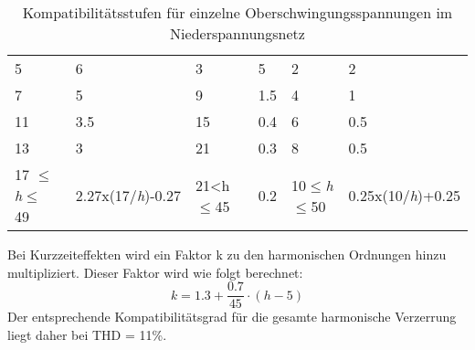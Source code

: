 \begin{table}[ht!]
{\begin{tabular}{|l|l|l|l|l|l|}
			5                                                         & 6                                                     & 3                                                       & 5                                                & 2                                           & 2                                         \\
			7                                                         & 5                                                     & 9                                                       & 1.5                                              & 4                                           & 1                                         \\
			11                                                        & 3.5                                                   & 15                                                      & 0.4                                              & 6                                           & 0.5                                       \\
			13                                                        & 3                                                     & 21                                                      & 0.3                                              & 8                                           & 0.5                                       \\
			17 $\leq$\textit{h}$\leq$ 49                                                   & 2.27x(17/\textit{h})-0.27                                   & 21<h$\leq$45                                                 & 0.2                                              & 10$\leq$\textit{h}$\leq$50                                     & 0.25x(10/\textit{h})+0.25                       \\ \hline
	\end{tabular}}
	\caption{Kompatibilitätsstufen für einzelne Oberschwingungsspannungen im Niederspannungsnetz}\label{Test1}
\end{table}

Bei Kurzzeiteffekten wird ein Faktor k zu den harmonischen Ordnungen hinzu multipliziert. Dieser Faktor wird wie folgt berechnet: 
\begin{equation}\label{eq:factor_k_für_kurzzeiteffekte}
k = {1.3+\frac{0.7}{45}\cdot(h-5)}
\end{equation}
Der entsprechende Kompatibilitätsgrad für die gesamte harmonische Verzerrung liegt daher bei THD = 11\%.




